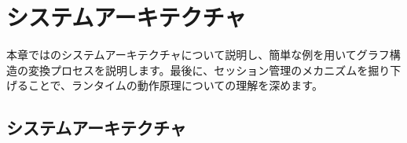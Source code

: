 \begin{savequote}[45mm]
\end{savequote}

\chapter{システムアーキテクチャ} 
\label{ch:architecture}

\begin{content}

本章では\tf{}のシステムアーキテクチャについて説明し、簡単な例を用いてグラフ構造の変換プロセスを説明します。最後に、セッション管理のメカニズムを掘り下げることで、\tf{}ランタイムの動作原理についての理解を深めます。

\end{content}

\section{システムアーキテクチャ}
	
